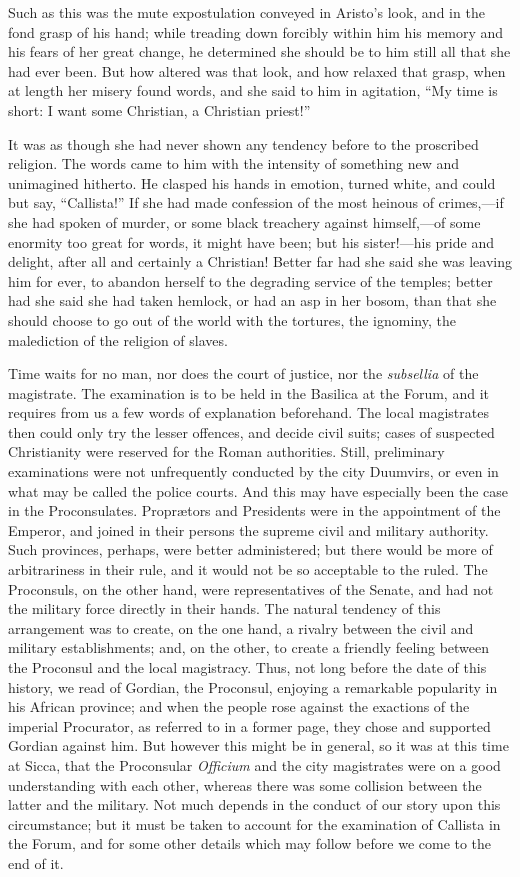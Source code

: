 Such as this was the mute expostulation conveyed in Aristo's look,
and in the fond grasp of his hand; while treading down forcibly within
him his memory and his fears of her great change, he determined she
should be to him still all that she had ever been. But how altered was
that look, and how relaxed that grasp, when at length her misery found
words, and she said to him in agitation, ``My time is short: I
want some Christian, a Christian priest!''

It was as though she had never shown any tendency before to the
proscribed religion. The words came to him with the intensity of
something new and unimagined hitherto. He clasped his hands in
emotion, turned white, and could but say, ``Callista!'' If she
had made confession of the most heinous of crimes,—if she had spoken
of murder, or some black treachery against himself,—of some
enormity too great for words, it might have been; but his sister!—his
pride and delight, after all and certainly a Christian! Better far had
she said she was leaving him for ever, to abandon herself to the
degrading service of the temples; better had she said she had taken
hemlock, or had an asp in her bosom, than that she should choose to go
out of the world with the tortures, the ignominy, the malediction of
the religion of slaves.

Time waits for no man, nor does the court of justice, nor the \emph{subsellia}
of the magistrate. The examination is to be held in the Basilica at
the Forum, and it requires from us a few words of explanation
beforehand. The local magistrates then could only try the lesser
offences, and decide civil suits; cases of suspected Christianity were
reserved for the Roman authorities. Still, preliminary examinations
were not unfrequently conducted by the city Duumvirs, or even in what
may be called the police courts. And this may have especially been the
case in the Proconsulates. Proprætors and Presidents were in the
appointment of the Emperor, and joined in their persons the supreme
civil and military authority. Such provinces, perhaps, were better
administered; but there would be more of arbitrariness in their rule,
and it would not be so acceptable to the ruled. The Proconsuls, on the
other hand, were representatives of the Senate, and had not the
military force directly in their hands. The natural tendency of this
arrangement was to create, on the one hand, a rivalry between
the civil and military establishments; and, on the other, to create a
friendly feeling between the Proconsul and the local magistracy. Thus,
not long before the date of this history, we read of Gordian, the
Proconsul, enjoying a remarkable popularity in his African province;
and when the people rose against the exactions of the imperial
Procurator, as referred to in a former page, they chose and supported
Gordian against him. But however this might be in general, so it was
at this time at Sicca, that the Proconsular \emph{Officium} and the
city magistrates were on a good understanding with each other, whereas
there was some collision between the latter and the military. Not much
depends in the conduct of our story upon this circumstance; but it
must be taken to account for the examination of Callista in the Forum,
and for some other details which may follow before we come to the end
of it.

